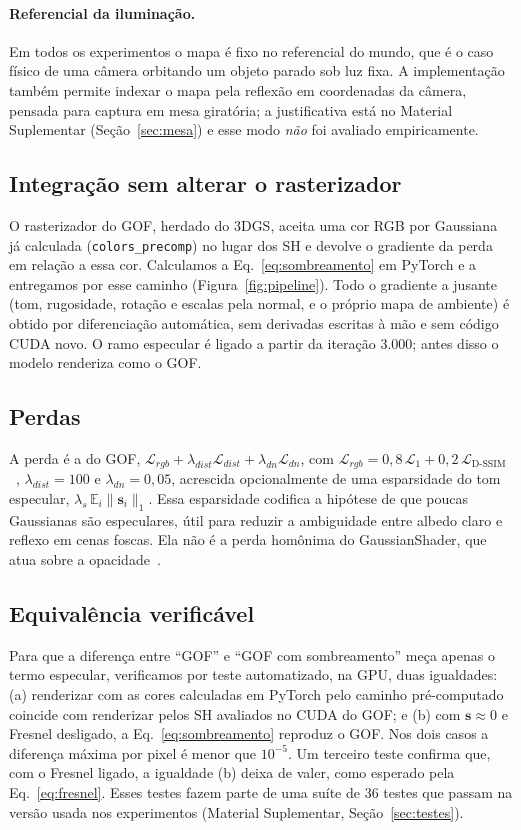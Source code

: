 \documentclass[12pt]{article}
\newcommand{\bs}{\mathbf{s}}
\begin{document}
\paragraph{Referencial da iluminação.}
Em todos os experimentos o mapa é fixo no referencial do mundo, que é o caso físico de uma câmera orbitando um objeto parado sob luz fixa.
A implementação também permite indexar o mapa pela reflexão em coordenadas da câmera, pensada para captura em mesa giratória; a justificativa está no Material Suplementar (Seção~\ref{sec:mesa}) e esse modo \emph{não} foi avaliado empiricamente.

\subsection{Integração sem alterar o rasterizador}
O rasterizador do GOF, herdado do 3DGS, aceita uma cor RGB por Gaussiana já calculada (\texttt{colors\_precomp}) no lugar dos SH e devolve o gradiente da perda em relação a essa cor.
Calculamos a Eq.~\ref{eq:sombreamento} em PyTorch e a entregamos por esse caminho (Figura~\ref{fig:pipeline}).
Todo o gradiente a jusante (tom, rugosidade, rotação e escalas pela normal, e o próprio mapa de ambiente) é obtido por diferenciação automática, sem derivadas escritas à mão e sem código CUDA novo.
O ramo especular é ligado a partir da iteração 3.000; antes disso o modelo renderiza como o GOF.

\subsection{Perdas}
A perda é a do GOF, $\mathcal{L}_{rgb}+\lambda_{dist}\mathcal{L}_{dist}+\lambda_{dn}\mathcal{L}_{dn}$, com $\mathcal{L}_{rgb}=0{,}8\,\mathcal{L}_1+0{,}2\,\mathcal{L}_{\text{D-SSIM}}$~\cite{kerbl2023gaussian}, $\lambda_{dist}=100$ e $\lambda_{dn}=0{,}05$, acrescida opcionalmente de uma esparsidade do tom especular, $\lambda_s\,\mathbb{E}_i\lVert\bs_i\rVert_1$.
Essa esparsidade codifica a hipótese de que poucas Gaussianas são especulares, útil para reduzir a ambiguidade entre albedo claro e reflexo em cenas foscas.
Ela não é a perda homônima do GaussianShader, que atua sobre a opacidade~\cite{jiang2024gaussianshader}.

\subsection{Equivalência verificável}
\label{sec:equivalencia}
Para que a diferença entre ``GOF'' e ``GOF com sombreamento'' meça apenas o termo especular, verificamos por teste automatizado, na GPU, duas igualdades:
(a) renderizar com as cores calculadas em PyTorch pelo caminho pré-computado coincide com renderizar pelos SH avaliados no CUDA do GOF; e
(b) com $\bs\approx 0$ e Fresnel desligado, a Eq.~\ref{eq:sombreamento} reproduz o GOF.
Nos dois casos a diferença máxima por pixel é menor que $10^{-5}$.
Um terceiro teste confirma que, com o Fresnel ligado, a igualdade (b) deixa de valer, como esperado pela Eq.~\ref{eq:fresnel}.
Esses testes fazem parte de uma suíte de 36 testes que passam na versão usada nos experimentos (Material Suplementar, Seção~\ref{sec:testes}).
\end{document}
